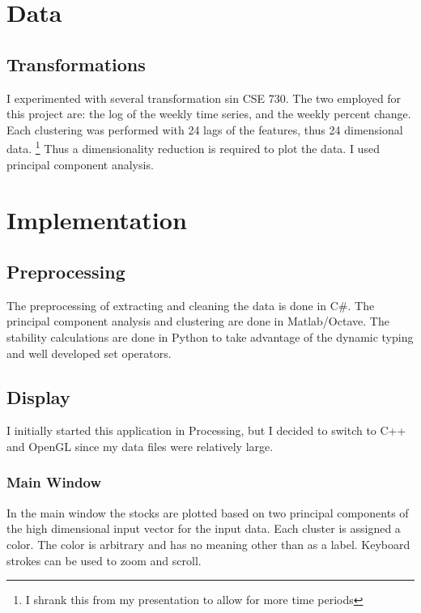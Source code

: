 \documentclass{article}
\begin{document}
\begin{multicols}{2}
\section{Data}
\subsection{Transformations}
I experimented with several transformation sin CSE 730.  The two employed for this project are: the log of the weekly time series, and the  weekly percent change.  Each clustering was performed with 24 lags of the features, thus 24 dimensional data. \footnote{I shrank this from my presentation to allow for more time periods}  Thus a dimensionality reduction is required to plot the data.  I used principal component analysis.
\section{Implementation}
\subsection{Preprocessing}
The preprocessing of extracting and cleaning the data is done in C\#.  The principal component analysis and clustering are done in Matlab/Octave.  The stability calculations are done in Python to take advantage of the dynamic typing and well developed set operators.
\subsection{Display}
I initially started this application in Processing, but I decided to switch to C++ and OpenGL since my data files were relatively large.  
\subsubsection{Main Window}
In the main window the stocks are plotted based on two principal components of the high dimensional input vector for the input data.  Each cluster is assigned a color.  The color is arbitrary and has no meaning other than as a label.  Keyboard strokes can be used to zoom and scroll.


\end{multicols}
\end{document}
